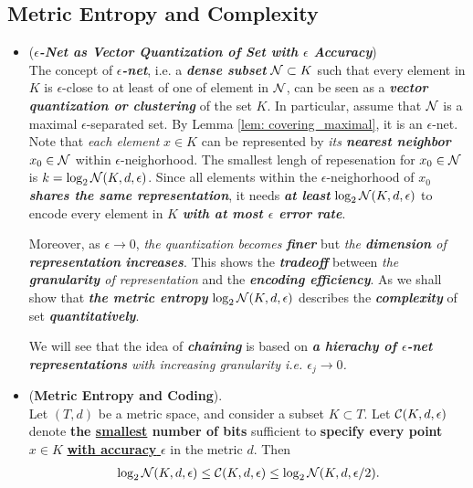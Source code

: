 \documentclass[11pt]{article}
\begin{document}
\subsection{Metric Entropy and Complexity}
\begin{itemize}
\item \begin{remark}(\textbf{\emph{$\epsilon$-Net as Vector Quantization of Set with $\epsilon$ Accuracy}})\\
The concept of \emph{\textbf{$\epsilon$-net}}, i.e. a \emph{\textbf{dense subset}} ${\mathcal N} \subset K$ such that every element in $K$ is $\epsilon$-close to at least of one of element in ${\mathcal N}$, can be seen as a \emph{\textbf{vector quantization or clustering}} of the set $K$.  In particular, assume that ${\mathcal N}$ is a maximal $\epsilon$-separated set. By Lemma \ref{lem: covering_maximal}, it is an $\epsilon$-net. Note that  \emph{each element} $x \in K$ can be represented by \emph{its \textbf{nearest neighbor}} $x_0 \in {\mathcal N}$ within $\epsilon$-neighorhood. The smallest lengh of repesenation for $x_0 \in {\mathcal N}$ is $k =  \log_{2} {\mathcal N}(K, d, \epsilon)$. Since all elements within the $\epsilon$-neighorhood of $x_0$ \emph{\textbf{shares the same representation}}, it needs \emph{\textbf{at least}} $\log_{2} {\mathcal N}(K, d, \epsilon)$ to encode every element in $K$ \emph{\textbf{with at most $\epsilon$ error rate}}.

Moreover, as $\epsilon \to 0$, \emph{the quantization becomes \textbf{finer}} but \emph{the \textbf{dimension} of \textbf{representation} \textbf{increases}}. This shows the \emph{\textbf{tradeoff}} between \emph{the \textbf{granularity} of representation} and the  \emph{\textbf{encoding efficiency}}. As we shall show that \emph{\textbf{the metric entropy}} $\log_{2} {\mathcal N}(K, d, \epsilon)$ describes the \emph{\textbf{complexity}} of set \emph{\textbf{quantitatively}}.

We will see that the idea of \emph{\textbf{chaining}} is based on \emph{\textbf{a hierachy of  $\epsilon$-net representations} with increasing granularity i.e. $\epsilon_j \to 0$.} 
\end{remark}

\item \begin{theorem} (\textbf{Metric Entropy and Coding}).  \citep{vershynin2018high}\\
Let $(T, d)$ be a metric space, and consider a subset $K \subset T$. Let ${\mathcal C}(K, d,  \epsilon)$ denote \textbf{the \underline{smallest} number of bits} sufficient to \textbf{specify every point} $x \in K$ \underline{\textbf{with accuracy} $\epsilon$} in the metric $d$. Then
\begin{align}
\log_2 {\mathcal N}(K, d, \epsilon) \le  {\mathcal C}(K, d,  \epsilon) \le \log_2 {\mathcal N}(K, d, \epsilon/2). \label{ineqn: metric_entropy_coding_set}
\end{align} 
\end{theorem}


\end{itemize}
\end{document}
